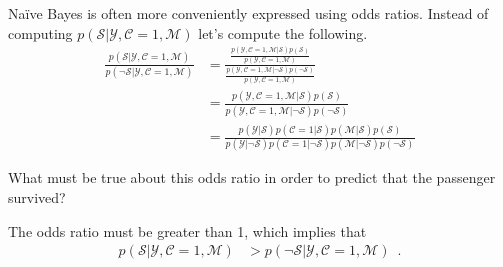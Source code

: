 \documentclass[assignment03_Solutions]{subfiles}
\begin{document}
\begin{exercise}[(45 minutes)]
\item Na\"ive Bayes is often more conveniently expressed using odds ratios.  Instead of computing $p(\mathcal{S}|\mathcal{Y}, \mathcal{C}=1, \mathcal{M})$ let's compute the following.
\begin{align}
\frac{p(\mathcal{S}|\mathcal{Y}, \mathcal{C}=1, \mathcal{M})}{p(\neg \mathcal{S}|\mathcal{Y}, \mathcal{C}=1, \mathcal{M})} &= \frac{\frac{p(\mathcal{Y}, \mathcal{C}=1, \mathcal{M} | \mathcal{S})p(\mathcal{S})}{p(\mathcal{Y},\mathcal{C}=1, \mathcal{M})}}{\frac{p(\mathcal{Y}, \mathcal{C}=1, \mathcal{M} | \neg \mathcal{S})p(\neg \mathcal{S})}{p(\mathcal{Y},\mathcal{C}=1, \mathcal{M})}} \nonumber \\
&=  \frac{p(\mathcal{Y}, \mathcal{C}=1, \mathcal{M} | \mathcal{S})p(\mathcal{S})}{p(\mathcal{Y}, \mathcal{C}=1, \mathcal{M} | \neg \mathcal{S})p(\neg \mathcal{S})} \nonumber \\
&= \frac{p(\mathcal{Y} | \mathcal{S}) p(\mathcal{C}=1 | \mathcal{S}) p(\mathcal{M} | \mathcal{S})p(\mathcal{S})}{p(\mathcal{Y}| \neg \mathcal{S}) p(\mathcal{C}=1 | \neg \mathcal{S}) p(\mathcal{M} | \neg \mathcal{S})p(\neg \mathcal{S})} \nonumber
\end{align}

What must be true about this odds ratio in order to predict that the passenger survived?
\begin{boxedsolution}
The odds ratio must be greater than 1, which implies that
\begin{align}
p(\mathcal{S}|\mathcal{Y}, \mathcal{C}=1, \mathcal{M}) &> p(\neg \mathcal{S}|\mathcal{Y}, \mathcal{C}=1, \mathcal{M}) \enspace . \nonumber
\end{align}
\end{boxedsolution}

\ees
\end{exercise}
\end{document}
